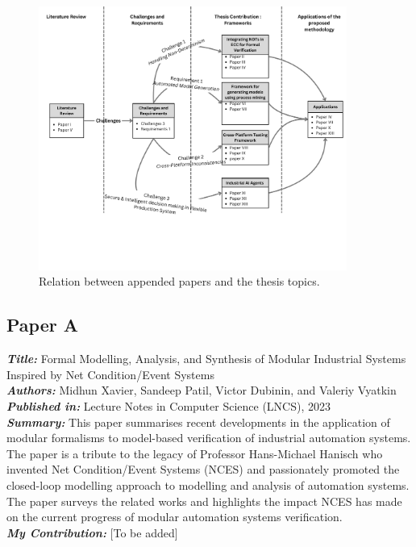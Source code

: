 \begin{figure}[htbp]
    \centering
    \includegraphics[width=0.9\textwidth]{chapters/images/chapter1/Literature Review.png}
    \caption{Relation between appended papers and the thesis topics.}
    \label{fig:ch1:paper_relationship}
\end{figure}

\subsection{Paper A}
\textbf{\textit{Title:}} Formal Modelling, Analysis, and Synthesis of Modular Industrial Systems Inspired by Net Condition/Event Systems\\
\textbf{\textit{Authors:}} Midhun Xavier, Sandeep Patil, Victor Dubinin, and Valeriy Vyatkin\\
\textbf{\textit{Published in:}} Lecture Notes in Computer Science (LNCS), 2023\\
\textbf{\textit{Summary:}} This paper summarises recent developments in the application of modular formalisms to model-based verification of industrial automation systems. The paper is a tribute to the legacy of Professor Hans-Michael Hanisch who invented Net Condition/Event Systems (NCES) and passionately promoted the closed-loop modelling approach to modelling and analysis of automation systems. The paper surveys the related works and highlights the impact NCES has made on the current progress of modular automation systems verification.\\
\textbf{\textit{My Contribution:}} [To be added]

